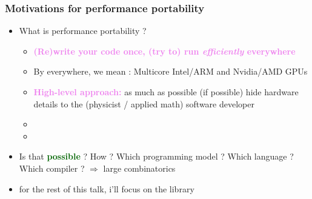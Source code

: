 \begin{frame}
  \frametitle{Motivations for performance portability}

  \begin{itemize}
  \item {\Large What is performance portability ?}
    \begin{itemize}
    \item \textcolor{violet}{\large \bf (Re)write your code once, (try to) run {\it efficiently} everywhere}
    \item By everywhere, we mean : Multicore Intel/ARM and Nvidia/AMD GPUs
    \item \textcolor{violet}{\bf High-level approach:} as much as possible (if possible) hide hardware details to the (physicist / applied math) software developer
    \item {}
    \item {}
    \end{itemize}
  \item {\large Is that \textcolor{darkgreen}{\bf possible} ? How ? Which programming model ? Which language ? Which compiler ? $\Rightarrow$ large combinatorics}
  \item for the rest of this talk, i'll focus on the  library
  \end{itemize}

\end{frame}

